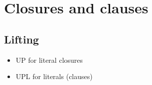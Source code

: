 \documentclass[%
handout,
]{beamer}
\begin{document}
\section{Closures and clauses}
\subsection{Lifting}
\begin{frame}
    \begin{itemize}
        \item UP for literal closures
        \vspace{-1.4em}
            
            \vspace{-2.1em}
            

        \vspace{0.7em}

    \item UPL for literals (clauses)
    \vspace{-1.4em}
    
    \vspace{-2.1em}
    
\end{itemize}


\end{frame}


\end{document}
